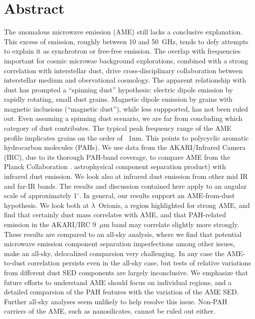 \chapter*{Abstract}
The anomalous microwave emission (AME) still lacks a conclusive explanation.  This excess of emission, roughly between 10 and 50~GHz, tends to defy attempts to explain it as synchrotron or free-free emission. The overlap with frequencies important for cosmic microwae background explorations, combined with a strong correlation with interstellar dust, drive cross-disciplinary collaboration between interstellar medium and obervational cosmology. The apparent relationship with dust has prompted a ``spinning dust'' hypothesis:  electric dipole emission by rapidly rotating, small dust grains. Magnetic dipole emission by grains with magnetic inclusions (``magnetic dust''), while less suppported, has not been ruled out. Even assuming a spinning dust scenario, we are far from concluding which category of dust contributes. The typical peak frequency range of the AME profile implicates grains on the order of ~1nm. This points to polycyclic aromatic hydrocarbon molecules (PAHs). We use data from the AKARI/Infrared Camera (IRC)\cite{irc07,ishihara10}, due to its thorough PAH-band coverage, to compare AME from the Planck Collaboration \cite{planck15X}. astrophysical component separation product) with infrared dust emission. We look also at infrared dust emission from other mid IR and far-IR bands. The results and discussion contained here apply to an angular scale of approximately 1$^{\circ}$. In general, our results support an AME-from-dust hypothesis. We look both at $\lambda$~Orionis, a region highlighted for strong AME, and find that certainly dust mass correlates with AME, and that PAH-related emission in the AKARI/IRC 9~$\mu$m band may correlate slightly more strongly. These results are compared to an all-sky analysis, where we find that potential microwave emission component separation imperfections among other issues, make an all-sky, delocalized comparsion very challenging. In any case the AME-to-dust correlation persists even in the all-sky case, but tests of relative variations from different dust SED components are largely inconclusive. We emphasize that future efforts to understand AME should focus on individual regions, and a detailed comparsion of the PAH features with the variation of the AME SED. Further all-sky analyses seem unlikely to help resolve this issue. Non-PAH carriers of the AME, such as nanosilicates, cannot be ruled out either.
